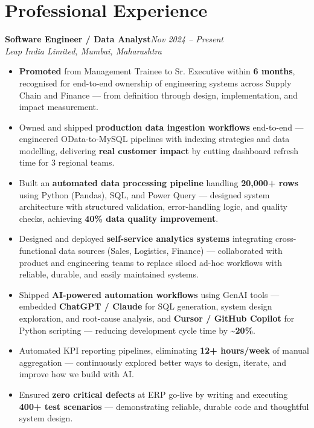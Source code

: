\documentclass[10pt, letterpaper]{article}
\newcommand{\role}[3]{%
  \vspace{2pt}%
  {\bfseries #1}\hfill{\small\color{muted}\textit{#3}}\\[-2pt]%
  {\small\color{muted}\textit{#2}}%
}
\begin{document}
\section{Professional Experience}

\role{Software Engineer / Data Analyst}{Leap India Limited, Mumbai, Maharashtra}{Nov 2024 – Present}

\begin{itemize}
  \item \textbf{Promoted} from Management Trainee to Sr. Executive within \textbf{6 months}, recognised for end-to-end ownership of engineering systems across Supply Chain and Finance — from definition through design, implementation, and impact measurement.
  \item Owned and shipped \textbf{production data ingestion workflows} end-to-end — engineered OData-to-MySQL pipelines with indexing strategies and data modelling, delivering \textbf{real customer impact} by cutting dashboard refresh time for 3 regional teams.
  \item Built an \textbf{automated data processing pipeline} handling \textbf{20,000+ rows} using Python (Pandas), SQL, and Power Query — designed system architecture with structured validation, error-handling logic, and quality checks, achieving \textbf{40\% data quality improvement}.
  \item Designed and deployed \textbf{self-service analytics systems} integrating cross-functional data sources (Sales, Logistics, Finance) — collaborated with product and engineering teams to replace siloed ad-hoc workflows with reliable, durable, and easily maintained systems.
  \item Shipped \textbf{AI-powered automation workflows} using GenAI tools — embedded \textbf{ChatGPT / Claude} for SQL generation, system design exploration, and root-cause analysis, and \textbf{Cursor / GitHub Copilot} for Python scripting — reducing development cycle time by \textbf{\textasciitilde20\%}.
  \item Automated KPI reporting pipelines, eliminating \textbf{12+ hours/week} of manual aggregation — continuously explored better ways to design, iterate, and improve how we build with AI.
  \item Ensured \textbf{zero critical defects} at ERP go-live by writing and executing \textbf{400+ test scenarios} — demonstrating reliable, durable code and thoughtful system design.
\end{itemize}
\end{document}
